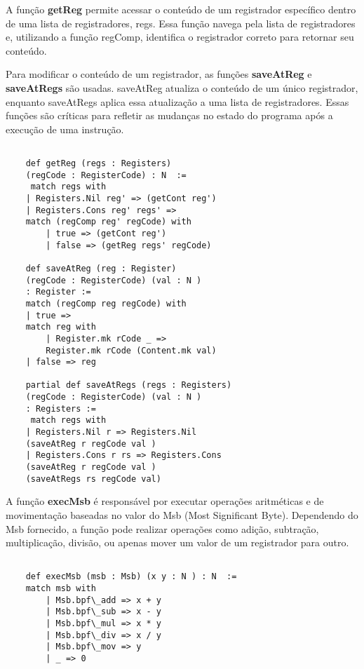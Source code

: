 \documentclass[sigconf]{acmart}
\begin{document}
A função \textbf{getReg} permite acessar o conteúdo de um registrador específico dentro de uma lista de registradores, regs. Essa função navega pela lista de registradores e, utilizando a função regComp, identifica o registrador correto para retornar seu conteúdo.

Para modificar o conteúdo de um registrador, as funções \textbf{saveAtReg} e \textbf{saveAtRegs} são usadas. saveAtReg atualiza o conteúdo de um único registrador, enquanto saveAtRegs aplica essa atualização a uma lista de registradores. Essas funções são críticas para refletir as mudanças no estado do programa após a execução de uma instrução.

\begin{center}
\begin{verbatim}
    
    def getReg (regs : Registers) 
    (regCode : RegisterCode) : N  :=
     match regs with
    | Registers.Nil reg' => (getCont reg')
    | Registers.Cons reg' regs' =>  
    match (regComp reg' regCode) with
        | true => (getCont reg')
        | false => (getReg regs' regCode)

    def saveAtReg (reg : Register) 
    (regCode : RegisterCode) (val : N ) 
    : Register :=
    match (regComp reg regCode) with
    | true =>
    match reg with
        | Register.mk rCode _ => 
        Register.mk rCode (Content.mk val)
    | false => reg

    partial def saveAtRegs (regs : Registers) 
    (regCode : RegisterCode) (val : N ) 
    : Registers :=
     match regs with
    | Registers.Nil r => Registers.Nil 
    (saveAtReg r regCode val )
    | Registers.Cons r rs => Registers.Cons 
    (saveAtReg r regCode val )
    (saveAtRegs rs regCode val)

\end{verbatim}
\end{center}

A função \textbf{execMsb} é responsável por executar operações aritméticas e de movimentação baseadas no valor do Msb (Most Significant Byte). Dependendo do Msb fornecido, a função pode realizar operações como adição, subtração, multiplicação, divisão, ou apenas mover um valor de um registrador para outro.

\begin{center}
\begin{verbatim}
        
    def execMsb (msb : Msb) (x y : N ) : N  :=
    match msb with
        | Msb.bpf\_add => x + y
        | Msb.bpf\_sub => x - y
        | Msb.bpf\_mul => x * y
        | Msb.bpf\_div => x / y
        | Msb.bpf\_mov => y
        | _ => 0
  
\end{verbatim}
\end{center}
\end{document}
